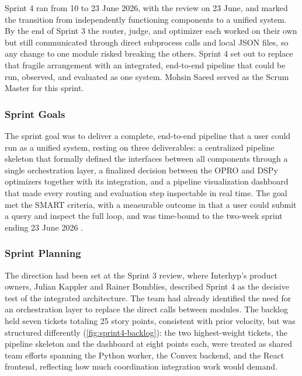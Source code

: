 \label{sec:sprint4}

Sprint 4 ran from 10 to 23 June 2026, with the review on 23 June, and marked the transition from independently functioning components to a unified system. By the end of Sprint 3 the router, judge, and optimizer each worked on their own but still communicated through direct subprocess calls and local JSON files, so any change to one module risked breaking the others. Sprint 4 set out to replace that fragile arrangement with an integrated, end-to-end pipeline that could be run, observed, and evaluated as one system. Mohsin Saeed served as the Scrum Master for this sprint.

\subsubsection{Sprint Goals}\label{sec:sprint4-goals}

The sprint goal was to deliver a complete, end-to-end pipeline that a user could run as a unified system, resting on three deliverables: a centralized pipeline skeleton that formally defined the interfaces between all components through a single orchestration layer, a finalized decision between the OPRO and DSPy optimizers together with its integration, and a pipeline visualization dashboard that made every routing and evaluation step inspectable in real time. The goal met the SMART criteria, with a measurable outcome in that a user could submit a query and inspect the full loop, and was time-bound to the two-week sprint ending 23 June 2026 \autocite{schwaber2020scrum}.

\subsubsection{Sprint Planning}\label{sec:sprint4-planning}

The direction had been set at the Sprint 3 review, where Interhyp's product owners, Julian Kappler and Rainer Bomblies, described Sprint 4 as the decisive test of the integrated architecture. The team had already identified the need for an orchestration layer to replace the direct calls between modules. The backlog held seven tickets totaling 25 story points, consistent with prior velocity, but was structured differently (\cref{fig:sprint4-backlog}): the two highest-weight tickets, the pipeline skeleton and the dashboard at eight points each, were treated as shared team efforts spanning the Python worker, the Convex backend, and the React frontend, reflecting how much coordination integration work would demand.

